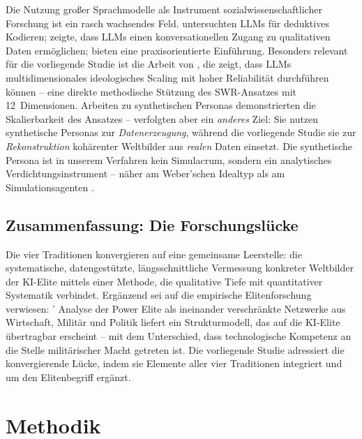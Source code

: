 \documentclass[12pt,a4paper]{article}
\begin{document}
Die Nutzung gro\ss{}er Sprachmodelle als Instrument sozialwissenschaftlicher Forschung ist ein rasch wachsendes Feld. \citet{Tai2024} untersuchten LLMs f\"ur deduktives Kodieren; \citet{Hayes2025} zeigte, dass LLMs einen konversationellen Zugang zu qualitativen Daten erm\"oglichen; \citet{NicmanisSpurrier2025} bieten eine praxisorientierte Einf\"uhrung. Besonders relevant f\"ur die vorliegende Studie ist die Arbeit von \citet{OrnsteinEtAl2025}, die zeigt, dass LLMs multidimensionales ideologisches Scaling mit hoher Reliabilit\"at durchf\"uhren k\"onnen -- eine direkte methodische St\"utzung des SWR-Ansatzes mit 12~Dimensionen. Arbeiten zu synthetischen Personas \citep{Ge2024} demonstrierten die Skalierbarkeit des Ansatzes -- verfolgten aber ein \emph{anderes} Ziel: Sie nutzen synthetische Personas zur \emph{Datenerzeugung}, w\"ahrend die vorliegende Studie sie zur \emph{Rekonstruktion} koh\"arenter Weltbilder aus \emph{realen} Daten einsetzt. Die synthetische Persona ist in unserem Verfahren kein Simulacrum, sondern ein analytisches Verdichtungsinstrument -- n\"aher am Weber'schen Idealtyp als am Simulationsagenten \citep[vgl.][]{Booth1961, NgRussell2000, JaraEttinger2019}.


\subsection{Zusammenfassung: Die Forschungsl\"ucke}
\label{sec:forschungsstand:luecke}

Die vier Traditionen konvergieren auf eine gemeinsame Leerstelle: die systematische, datengest\"utzte, l\"angsschnittliche Vermessung konkreter Weltbilder der KI-Elite mittels einer Methode, die qualitative Tiefe mit quantitativer Systematik verbindet. Erg\"anzend sei auf die empirische Elitenforschung verwiesen: \citeauthor{Mills1956}' Analyse der \glqq Power Elite\grqq{} als ineinander verschr\"ankte Netzwerke aus Wirtschaft, Milit\"ar und Politik liefert ein Strukturmodell, das auf die KI-Elite \"ubertragbar erscheint -- mit dem Unterschied, dass technologische Kompetenz an die Stelle milit\"arischer Macht getreten ist. Die vorliegende Studie adressiert die konvergierende L\"ucke, indem sie Elemente aller vier Traditionen integriert und um den Elitenbegriff erg\"anzt.


\section{Methodik}
\label{sec:methodik}
\end{document}
